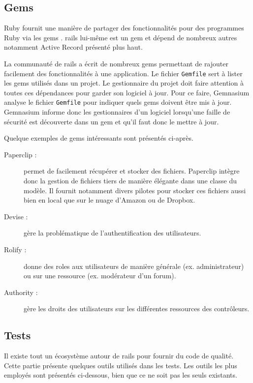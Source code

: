 \subsection{Gems}
\label{gems}
Ruby fournit une manière de partager des fonctionnalités pour des programmes Ruby via les \glspl{gem} \cite{gem}. \gls{rails} lui-même est un \gls{gem} et dépend de nombreux autres notamment Active Record présenté plus haut.

\label{gemnasium}
La communauté de \gls{rails} a écrit de nombreux \glspl{gem}  permettant de rajouter facilement des fonctionnalités à une application. Le fichier \texttt{Gemfile} sert à lister les \glspl{gem}  utilisés dans un projet. Le gestionnaire du projet doit faire attention à toutes ces dépendances pour garder son logiciel à jour. Pour ce faire, Gemnasium analyse le fichier \texttt{Gemfile} pour indiquer quels \glspl{gem}  doivent être mis à jour. Gemnasium informe donc les gestionnaires d'un logiciel lorsqu'une faille de sécurité est découverte dans un \gls{gem} et qu'il faut donc le mettre à jour.

Quelque exemples de \glspl{gem} intéressants sont présentés ci-après.
\begin{description}
  \item[Paperclip \cite{paperclip} :] permet de facilement récupérer et stocker des fichiers. Paperclip intègre donc la gestion de fichiers tiers de manière élégante dans une classe du modèle. Il fournit notamment divers pilotes pour stocker ces fichiers aussi bien en local que sur le nuage d'Amazon ou de Dropbox.
  \item[Devise \cite{devise} :] gère la problématique de l'authentification des utilisateurs.
  \item[Rolify \cite{rolify} :] donne des \glspl{role} aux utilisateurs de manière générale (ex. administrateur) ou sur une ressource (ex. modérateur d'un forum).\label{rolify}
  \item[Authority \cite{authority} :] gère les droits des utilisateurs sur les différentes ressources des contrôleurs. \label{authority}
\end{description}

\subsection{Tests}
\label{rails-tests}
Il existe tout un écosystème autour de \gls{rails} pour fournir du code de qualité. Cette partie présente quelques outils utilisés dans les tests. Les outils les plus employés sont présentés ci-dessous, bien que ce ne soit pas les seuls existants.

